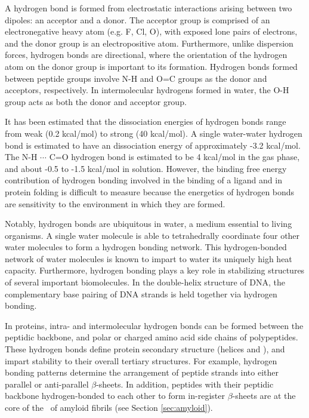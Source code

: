 A hydrogen bond is formed from electrostatic interactions arising between two dipoles: an acceptor and a donor.   The acceptor group is comprised of an electronegative heavy atom (e.g. F, Cl, O), with exposed lone pairs of electrons, and the donor group is an electropositive atom.  Furthermore, unlike dispersion forces, hydrogen bonds are directional, where the orientation of the hydrogen atom on the donor group is important to its formation. Hydrogen bonds formed between peptide groups involve N-H and O=C groups as the donor and acceptors, respectively.  In intermolecular hydrogens formed in water, the O-H group acts as both the donor and acceptor group.

It has been estimated that the dissociation energies of hydrogen bonds range from weak (0.2 kcal/mol) to strong (40 kcal/mol).\cite{Steiner:2002tb} A single water-water hydrogen bond is estimated to have an dissociation energy of approximately -3.2 kcal/mol.\cite{Steiner:2002tb}  The N-H $\cdots$ C=O hydrogen bond is estimated to be 4 kcal/mol in the gas phase,\cite{Klotz:1993fk} and about -0.5 to -1.5 kcal/mol in solution.\cite{Williams:1993wk} %
However, the binding free energy contribution of hydrogen bonding involved in the binding of a ligand and in protein folding is difficult to measure because the energetics of hydrogen bonds are sensitivity to the environment in which they are formed.\cite{Klotz:1993fk}

Notably, hydrogen bonds are ubiquitous in water, a medium essential to living organisms. A single water molecule is able to tetrahedrally coordinate four other water molecules to form a hydrogen bonding network. This hydrogen-bonded network of water molecules is known to impart to water its uniquely high heat capacity.  Furthermore, hydrogen bonding plays a key role in stabilizing structures of several important biomolecules.  In the double-helix structure of DNA,  the complementary base pairing of DNA strands is held together via hydrogen bonding.

In proteins, intra- and intermolecular hydrogen bonds can be formed between the peptidic backbone, and polar or charged amino acid side chains of polypeptides.  These hydrogen bonds define protein secondary structure (helices and \bsheets), and impart stability to their overall tertiary structures. For example, hydrogen bonding patterns determine the arrangement of peptide strands into either parallel or anti-parallel $\beta$-sheets. In addition, peptides with their peptidic backbone hydrogen-bonded to each other to form in-register $\beta$-sheets are at the core of the \crossbs\ of amyloid fibrils (see Section \ref{sec:amyloid}). 

